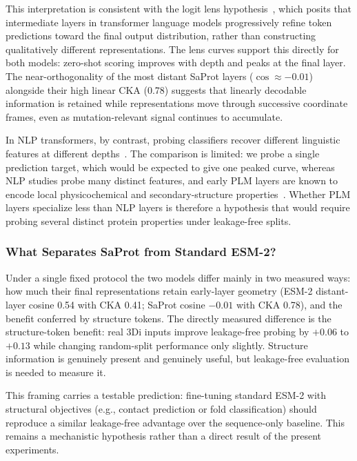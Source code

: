 \documentclass[numbered,webpdf,modern,large]{oup-authoring-template}
\newcommand{\rone}[1]{#1}
\newcommand{\rtwo}[1]{#1}
\newcommand{\rthree}[1]{#1}
\begin{document}
This interpretation is consistent with the logit lens
hypothesis~\cite{nostalgebraist2020,belrose2023eliciting},
which posits that intermediate layers in transformer language models progressively
refine token predictions toward the final output distribution, rather than
constructing qualitatively different representations. \rone{The lens
curves support this directly for both models: zero-shot scoring improves with depth
and peaks at the final layer.} The near-orthogonality of the most distant SaProt
layers ($\cos \approx -0.01$) \rone{alongside their high linear CKA (\rthree{0.78})}
\rtwo{suggests that linearly decodable information is retained while representations
move through successive coordinate frames, even as mutation-relevant signal continues
to accumulate.}

\rthree{In NLP transformers, by contrast, probing classifiers recover different
linguistic features at different depths~\cite{tenney2019bert,rogers2021bertology}. The
comparison is limited: we probe a single prediction target, which would be expected to
give one peaked curve, whereas NLP studies probe many distinct features, and early PLM
layers are known to encode local physicochemical and secondary-structure
properties~\cite{detlefsen2022}. Whether PLM layers specialize less than NLP layers is
therefore a hypothesis that would require probing several distinct protein properties
under leakage-free splits.}

\subsubsection{\rone{What Separates SaProt from Standard ESM-2?}}

\rone{Under \rtwo{a single fixed} protocol the two models differ mainly in two measured
ways: how much their final representations retain early-layer geometry (ESM-2
distant-layer cosine \rthree{0.54 with CKA 0.41}; SaProt cosine $-0.01$ with CKA \rthree{0.78}), and the benefit conferred by structure tokens. The directly measured
difference is the structure-token benefit: real 3Di inputs improve leakage-free
probing by \rthree{$+0.06$ to $+0.13$} while \rtwo{changing random-split performance only
slightly}. Structure information is genuinely present and genuinely useful, but
\rtwo{leakage-free evaluation is needed to measure it}.}

\rone{This framing carries a testable prediction: fine-tuning standard ESM-2
with structural objectives (e.g., contact prediction or fold classification)
should reproduce a similar leakage-free advantage over the sequence-only baseline.
This remains a mechanistic hypothesis rather than a direct result of the present
experiments.}
\end{document}
